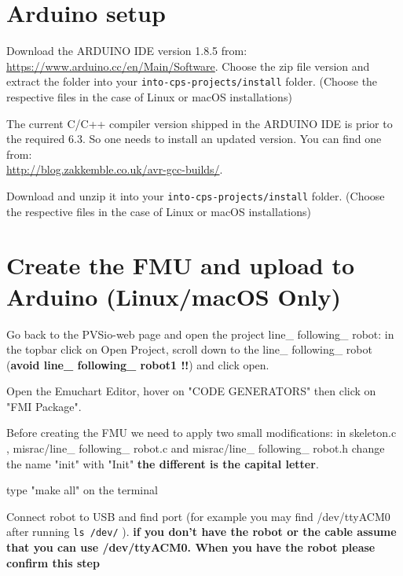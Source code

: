 \documentclass[11pt,a4paper]{../tutorial}
\begin{document}
\section{Arduino setup}
\begin{instructions}
\item Download the ARDUINO IDE version 1.8.5 from:\\
	\url{https://www.arduino.cc/en/Main/Software}.  Choose the zip file
	version and extract the folder into your
	\texttt{into-cps-projects/install} folder. (Choose the respective files in the case of Linux or macOS installations)
	
\item The current C/C++ compiler version shipped in the ARDUINO IDE is prior to the required 6.3. So one needs to install an updated version. You can find one from:\\
	\url{http://blog.zakkemble.co.uk/avr-gcc-builds/}. 
	
	Download and unzip it into your  \texttt{into-cps-projects/install} folder. (Choose the respective files in the case of Linux or macOS installations)
	
\section{Create the FMU and upload to Arduino (Linux/macOS Only)}


\item Go back to the PVSio-web page and open the project line\_ following\_ robot: in the topbar click on Open Project, scroll down to the line\_ following\_ robot (\textbf{avoid line\_ following\_ robot1 !!}) and click open.
\item Open the Emuchart Editor, hover on "CODE GENERATORS" then click on "FMI Package".
\item Before creating the FMU we need to apply two small modifications:
 in skeleton.c , misrac/line\_ following\_ robot.c and  misrac/line\_ following\_ robot.h change the name "init" with "Init" \textbf{the different is the capital letter}.
\item type "make all" on the terminal

\item Connect robot to USB and find port (for example you may find /dev/ttyACM0 after running \verb'ls /dev/' ). \textbf{if you don't have the robot or the cable assume that you can use /dev/ttyACM0. When you have the robot please confirm this step}




\end{instructions}
\end{document}
